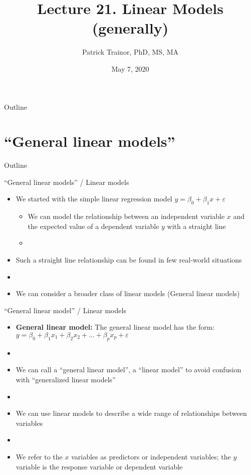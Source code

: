 \documentclass[xcolor=dvipsnames]{beamer}
\title[Lecture 21]{Lecture 21. Linear Models (generally)}
\author[Patrick Trainor]{Patrick Trainor, PhD, MS, MA}
\institute[NMSU]{New Mexico State University}
\date{May 7, 2020}
\begin{document}
\begin{frame}
\maketitle
\end{frame}

\begin{frame}{Outline}
\tableofcontents[hideallsubsections]
\end{frame}

\section{``General linear models''}
\begin{frame}{Outline}
	\tableofcontents[currentsection,subsectionstyle=show/shaded/hide]
\end{frame}

\begin{frame}{``General linear models'' / Linear models}
	\begin{itemize}
		\item We started with the simple linear regression model $y = \beta_0 + \beta_1 x + \varepsilon$ \pause
		\begin{itemize}
			\item We can model the relationship between an independent variable $x$ and the expected value of a dependent variable $y$ with a straight line \pause
			\item[]
		\end{itemize}
		\item Such a straight line relationship can be found in few real-world situations \pause
		\item[]
		\item We can consider a broader class of linear models (General linear models) 
	\end{itemize}
\end{frame}

\begin{frame}{``General linear model'' / Linear models}
	\begin{itemize}
		\item \textbf{General linear model:} The general linear model has the form: $y = \beta_0 + \beta_1 x_1 + \beta_2 x_2 + \hdots + \beta_p x_p + \varepsilon$ \pause
		\item[]
		\item We can call a ``general linear model'', a ``linear model'' to avoid confusion with ``generalized linear models'' \pause
		\item[]
		\item We can use linear models to describe a wide range of relationships between variables \pause
		\item[]
		\item We refer to the $x$ variables as predictors or independent variables; the $y$ variable is the response variable or dependent variable
	\end{itemize}
\end{frame}
\end{document}
